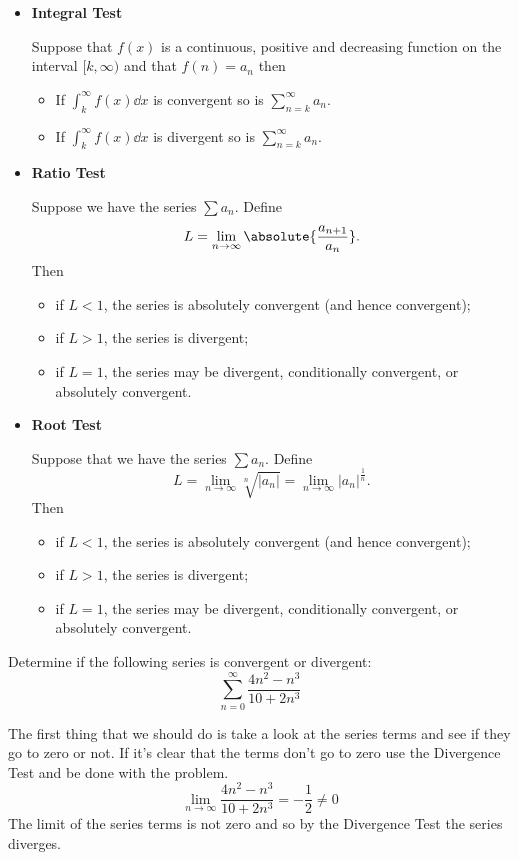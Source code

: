 \begin{itemize}
\item \textbf{Integral Test}

Suppose that $f(x)$ is a continuous, positive and decreasing function on the interval $[k,\infty)$ and that $f(n)=a_n$ then
\begin{itemize}
\item If $\int_k^\infty f(x)\dd{x}$ is convergent so is $\sum_{n=k}^\infty a_n$.
\item If $\int_k^\infty f(x)\dd{x}$ is divergent so is $\sum_{n=k}^\infty a_n$.
\end{itemize}

\item \textbf{Ratio Test}

Suppose we have the series $\sum a_n$. Define
\[ L=\lim_{n\to\infty}\absolute{\frac{a_{n+1}}{a_n}}. \]
Then
\begin{itemize}
\item if $L<1$, the series is absolutely convergent (and hence convergent);
\item if $L>1$, the series is divergent;
\item if $L=1$, the series may be divergent, conditionally convergent, or absolutely convergent.
\end{itemize}

\item \textbf{Root Test}

Suppose that we have the series $\sum a_n$. Define
\[ L = \lim_{n\to\infty}\sqrt[n]{|a_n|}=\lim_{n\to\infty}|a_n|^\frac{1}{n}. \]
Then
\begin{itemize}
\item if $L<1$, the series is absolutely convergent (and hence convergent);
\item if $L>1$, the series is divergent;
\item if $L=1$, the series may be divergent, conditionally convergent, or absolutely convergent.
\end{itemize}
\end{itemize}

\begin{exercise}
Determine if the following series is convergent or divergent:
\[ \sum_{n=0}^\infty  \frac{4n^2-n^3}{10+2n^3} \]
\end{exercise}

\begin{solution}
The first thing that we should do is take a look at the series terms and see if they go to zero or not. If it's clear that the terms don't go to zero use the Divergence Test and be done with the problem.
\[ \lim_{n\to\infty}\frac{4n^2-n^3}{10+2n^3}=-\frac{1}{2}\neq0 \]
The limit of the series terms is not zero and so by the Divergence Test the series diverges.
\end{solution}

